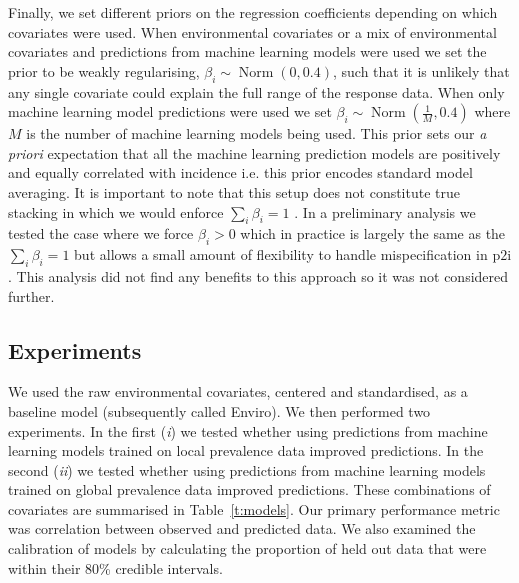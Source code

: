 \documentclass[review]{elsarticle}
\begin{document}
Finally, we set different priors on the regression coefficients depending on which covariates were used.
When environmental covariates or a mix of environmental covariates and predictions from machine learning models were used we set the prior to be weakly regularising, $\beta_i \sim \operatorname{Norm}(0, 0.4)$, such that it is unlikely that any single covariate could explain the full range of the response data.
When only machine learning model predictions were used we set $\beta_i \sim \operatorname{ Norm}(\frac{1}{M}, 0.4)$ where $M$ is the number of machine learning models being used. 
This prior  sets our \emph{a priori} expectation that all the machine learning prediction models are positively and equally correlated with incidence i.e. this prior encodes standard model averaging.
It is important to note that this setup does not constitute true stacking in which we would enforce $\sum_i \beta_i = 1$ \citep{bhatt2017improved}.
In a preliminary analysis we tested the case where we force $\beta_i > 0$ which in practice is largely the same as the $\sum_i \beta_i = 1$  \citep{breiman1996stacked} but allows a small amount of flexibility to handle mispecification in $\mathrm{p2i}$.
This analysis did not find any benefits to this approach so it was not considered further.


\subsection{Experiments}


We used the raw environmental covariates, centered and standardised, as a baseline model (subsequently called Enviro).
We then performed two experiments.
In the first (\emph{i}) we tested whether using predictions from machine learning models trained on local prevalence data improved predictions.
In the second (\emph{ii}) we tested whether using predictions from machine learning models trained on global prevalence data improved predictions.
These combinations of covariates are summarised in Table~\ref{t:models}.
Our primary performance metric was correlation between observed and predicted data.
We also examined the calibration of models by calculating the proportion of held out data that were within their 80\% credible intervals.
\end{document}

